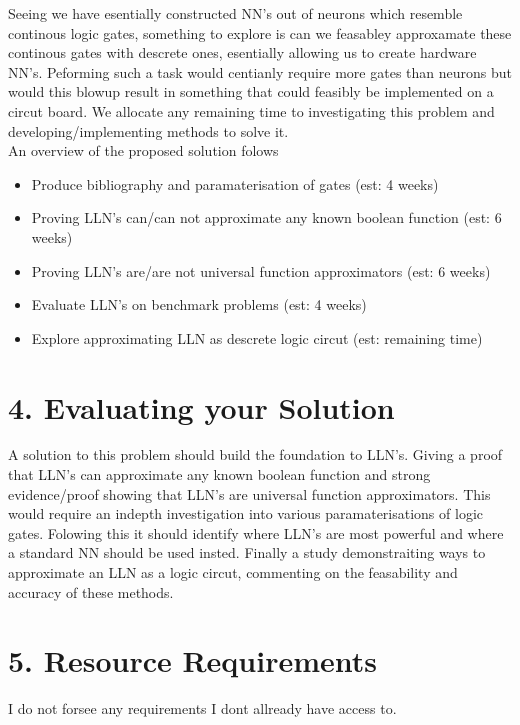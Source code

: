 \documentclass[11pt, a4paper, twoside, openright]{report}
\begin{document}
Seeing we have esentially constructed NN's out of neurons which resemble continous logic gates, something to explore is can we feasabley approxamate these continous gates with descrete ones, esentially allowing us to create hardware NN's. Peforming such a task would centianly require more gates than neurons but would this blowup result in something that could feasibly be implemented on a circut board. We allocate any remaining time to investigating this problem and developing/implementing methods to solve it.\\

An overview of the proposed solution folows
\begin{itemize}
\item Produce bibliography and paramaterisation of gates (est: 4 weeks)
\item Proving LLN's can/can not approximate any known boolean function (est: 6 weeks)
\item Proving LLN's are/are not universal function approximators (est: 6 weeks)
\item Evaluate LLN's on benchmark problems (est: 4 weeks)
\item Explore approximating LLN as descrete logic circut (est: remaining time)
\end{itemize}

\section*{4. Evaluating your Solution}

A solution to this problem should build the foundation to LLN's. Giving a proof that LLN's can approximate any known boolean function and strong evidence/proof showing that LLN's are universal function approximators. This would require an indepth investigation into various paramaterisations of logic gates. Folowing this it should identify where LLN's are most powerful and where a standard NN should be used insted. Finally a study demonstraiting ways to approximate an LLN as a logic circut, commenting on the feasability and accuracy of these methods.

\section*{5. Resource Requirements}

I do not forsee any requirements I dont allready have access to.

\backmatter

%


\end{document}
